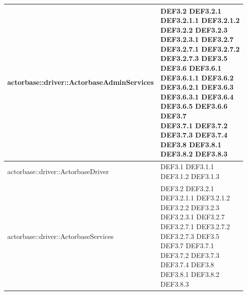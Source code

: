 \documentclass{scalatekids-article}
\begin{document}
\begin{longtable}[H]{|p{11.5cm}|p{5.5cm}|}
\hline
actorbase::driver::ActorbaseAdminServices & \multiLineCell[t]{DEF3.2 DEF3.2.1\\DEF3.2.1.1 DEF3.2.1.2\\DEF3.2.2 DEF3.2.3\\DEF3.2.3.1 DEF3.2.7\\DEF3.2.7.1 DEF3.2.7.2\\DEF3.2.7.3 DEF3.5\\DEF3.6 DEF3.6.1\\DEF3.6.1.1 DEF3.6.2\\DEF3.6.2.1 DEF3.6.3\\DEF3.6.3.1 DEF3.6.4\\DEF3.6.5 DEF3.6.6\\DEF3.7\\DEF3.7.1 DEF3.7.2\\DEF3.7.3 DEF3.7.4\\DEF3.8 DEF3.8.1\\DEF3.8.2 DEF3.8.3\\}\\
\hline
actorbase::driver::ActorbaseDriver & \multiLineCell[t]{DEF3.1 DEF3.1.1\\DEF3.1.2 DEF3.1.3\\}\\
\hline
actorbase::driver::ActorbaseServices & \multiLineCell[t]{DEF3.2 DEF3.2.1\\DEF3.2.1.1 DEF3.2.1.2\\DEF3.2.2 DEF3.2.3\\DEF3.2.3.1 DEF3.2.7\\DEF3.2.7.1 DEF3.2.7.2\\DEF3.2.7.3 DEF3.5\\DEF3.7 DEF3.7.1\\DEF3.7.2 DEF3.7.3\\DEF3.7.4 DEF3.8\\DEF3.8.1 DEF3.8.2\\DEF3.8.3}\\
\hline

\end{longtable}
\end{document}
